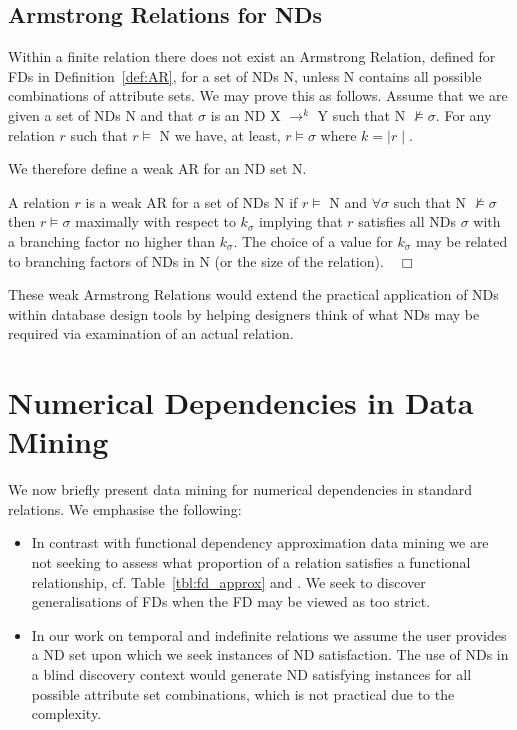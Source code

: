 \subsection{Armstrong Relations for NDs}\label{subsec:nd_ar}

Within a finite relation there does not exist an
Armstrong Relation, defined for FDs in Definition~\ref{def:AR}, for a
set of NDs N, unless N contains all possible 
combinations of attribute sets. We may prove this as follows. Assume that we
are given a set of NDs N and that $\sigma$ is an ND X $\to^k$ Y such that
N $\not\models \sigma$. For any relation $r$ such that $r \models$ N we
have, at least, $r \models \sigma$ where $k = \mid r \mid$.

\medskip
We therefore define a weak AR for an ND set N.

\begin{definition}\label{def:weak_AR}
\begin{rm}
A relation $r$ is a weak AR for a set of NDs N if $r \models$ N and
$\forall \sigma$ such that N $\not\models \sigma$ then $r \models
\sigma$ maximally 
with respect to $k_\sigma$ implying that $r$ satisfies all NDs
$\sigma$ with a branching 
factor no higher than $k_\sigma$. The choice of a value for $k_\sigma$
may be related to branching factors of NDs in N (or the size of the
relation).$\quad\Box$ 
\end{rm}
\end{definition}

These weak Armstrong Relations would extend the practical application
of NDs within database design tools by helping designers think of what
NDs may be required via examination of an actual relation. 

\section{Numerical Dependencies in Data Mining}\label{sec:nd_datamine}
We now briefly present data mining for numerical dependencies in
standard relations. We emphasise the following:
\begin{itemize}
\item In contrast with functional dependency approximation data mining
we are not seeking to assess what proportion of a relation satisfies a
functional relationship, cf. Table~\ref{tbl:fd_approx} and
\cite{hkp98,km95}. We seek to discover 
generalisations of FDs when the FD may be viewed as too strict.
\item In our work on temporal and indefinite relations we assume the
user provides a ND set upon which we seek instances of ND
satisfaction. The use of NDs in a blind discovery context would
generate ND satisfying instances for all possible attribute set
combinations, which is not practical due to the complexity.
\end{itemize}

